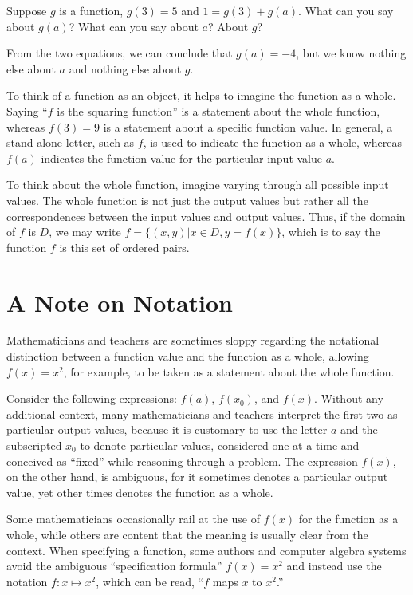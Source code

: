 \documentclass[space,handout,nooutcomes]{ximera}
\begin{document}
\begin{question}
Suppose $g$ is a function, $g(3) = 5$ and $1=g(3)+g(a)$.  What can you say about $g(a)$?  What can you say about $a$?  About $g$?
\begin{freeResponse}
\begin{hint}
From the two equations, we can conclude that $g(a)=-4$, but we know nothing else about $a$ and nothing else about $g$.  
\end{hint}
\end{freeResponse}
\end{question}

To think of a function as an object, it helps to imagine the function as a whole.  Saying ``$f$ is the squaring function'' is a statement about the whole function, whereas $f(3) = 9$ is a statement about a specific function value.  In general, a stand-alone letter, such as $f$, is used to indicate the function as a whole, whereas $f(a)$ indicates the function value for the particular input value $a$.  

To think about the whole function, imagine varying through all possible input values.  The whole function is not just the output values but rather all the correspondences between the input values and output values.  Thus, if the domain of $f$ is $D$, we may write $f=\{(x,y) | x\in D, y=f(x)\}$, which is to say the function $f$ is this set of ordered pairs.  

\section*{A Note on Notation}
Mathematicians and teachers are sometimes sloppy regarding the notational distinction between a function value and the function as a whole, allowing $f(x)=x^2$, for example, to be taken as a statement about the whole function. 

Consider the following expressions:  $f(a)$, $f(x_0)$, and $f(x)$.  Without any additional context, many mathematicians and teachers interpret the first two as particular output values, because it is customary to use the letter $a$ and the subscripted $x_0$ to denote particular values, considered one at a time and conceived as ``fixed'' while reasoning through a problem.  The expression $f(x)$, on the other hand, is ambiguous, for it sometimes denotes a particular output value, yet other times denotes the function as a whole.  

Some mathematicians occasionally rail at the use of  $f(x)$ for the function as a whole, while others are content that the meaning is usually clear from the context.  When specifying a function, some authors and computer algebra systems avoid the ambiguous ``specification formula'' $f(x)=x^2$ and instead use the notation $f: x\mapsto x^2$, which can be read, ``$f$ maps $x$ to $x^2$.''
\end{document}
